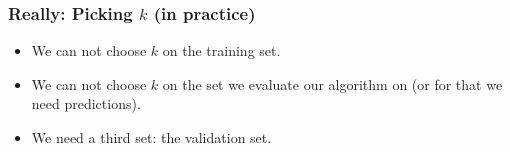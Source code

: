 \begin{frame}
    \frametitle{Really: Picking $k$ (in practice)}
    \begin{itemize}
        \item We can not choose $k$ on the training set.
        \item We can not choose $k$ on the set we evaluate our algorithm on (or
            for that we need predictions).
        \item We need a third set: the validation set.
    \end{itemize}
\end{frame}

